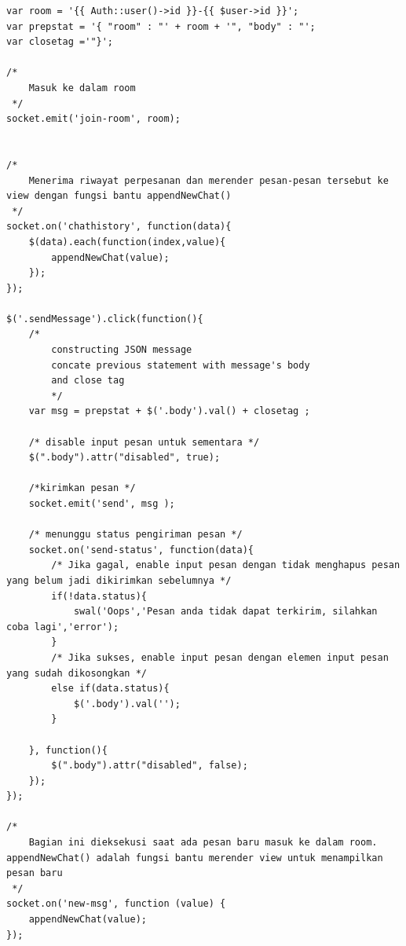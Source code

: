 \begin{lstlisting}[label=cdjq.04-04,style=htmlcssjs,caption=Implementasi Logika Pengiriman \& Penerimaan Pesan (menggunakan jQuery)]
var room = '{{ Auth::user()->id }}-{{ $user->id }}';
var prepstat = '{ "room" : "' + room + '", "body" : "';
var closetag ='"}';

/* 
	Masuk ke dalam room
 */
socket.emit('join-room', room);


/* 
	Menerima riwayat perpesanan dan merender pesan-pesan tersebut ke view dengan fungsi bantu appendNewChat()
 */
socket.on('chathistory', function(data){
    $(data).each(function(index,value){
        appendNewChat(value);
    });
});

$('.sendMessage').click(function(){
	/*	
		constructing JSON message 
		concate previous statement with message's body
		and close tag
		*/
    var msg = prepstat + $('.body').val() + closetag ;

    /* disable input pesan untuk sementara */
    $(".body").attr("disabled", true);

    /*kirimkan pesan */
    socket.emit('send', msg );

    /* menunggu status pengiriman pesan */
    socket.on('send-status', function(data){
    	/* Jika gagal, enable input pesan dengan tidak menghapus pesan yang belum jadi dikirimkan sebelumnya */
        if(!data.status){
            swal('Oops','Pesan anda tidak dapat terkirim, silahkan coba lagi','error');
        }
        /* Jika sukses, enable input pesan dengan elemen input pesan yang sudah dikosongkan */
        else if(data.status){
            $('.body').val('');
        }

    }, function(){
        $(".body").attr("disabled", false);
    });
});

/* 
	Bagian ini dieksekusi saat ada pesan baru masuk ke dalam room. appendNewChat() adalah fungsi bantu merender view untuk menampilkan pesan baru
 */
socket.on('new-msg', function (value) {
    appendNewChat(value);
});
\end{lstlisting}